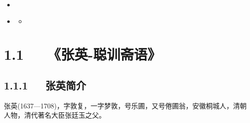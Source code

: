 \documentclass[letterpaper,10pt,english]{sphinxmanual}
\begin{document}
\begin{sphinxShadowBox}
\begin{itemize}
\begin{itemize}
\begin{itemize}
\item {} 
\label{\detokenize{p00_u5176_u5b83/_u300a_u5f20_u82f1-_u806a_u8bad_u658b_u8bed_u300b_u300a_u5f20_u5ef7_u7389-_u6f84_u6000_u56ed_u8bed_u300b_u5408_u8f91:id25}}{\hyperref[\detokenize{p00_u5176_u5b83/_u300a_u5f20_u82f1-_u806a_u8bad_u658b_u8bed_u300b_u300a_u5f20_u5ef7_u7389-_u6f84_u6000_u56ed_u8bed_u300b_u5408_u8f91:id12}]{}}

\item {} 
\label{\detokenize{p00_u5176_u5b83/_u300a_u5f20_u82f1-_u806a_u8bad_u658b_u8bed_u300b_u300a_u5f20_u5ef7_u7389-_u6f84_u6000_u56ed_u8bed_u300b_u5408_u8f91:id26}}{\hyperref[\detokenize{p00_u5176_u5b83/_u300a_u5f20_u82f1-_u806a_u8bad_u658b_u8bed_u300b_u300a_u5f20_u5ef7_u7389-_u6f84_u6000_u56ed_u8bed_u300b_u5408_u8f91:id13}]{}}
\begin{itemize}
\item {} 
\label{\detokenize{p00_u5176_u5b83/_u300a_u5f20_u82f1-_u806a_u8bad_u658b_u8bed_u300b_u300a_u5f20_u5ef7_u7389-_u6f84_u6000_u56ed_u8bed_u300b_u5408_u8f91:id27}}{\hyperref[\detokenize{p00_u5176_u5b83/_u300a_u5f20_u82f1-_u806a_u8bad_u658b_u8bed_u300b_u300a_u5f20_u5ef7_u7389-_u6f84_u6000_u56ed_u8bed_u300b_u5408_u8f91:id14}]{}}

\end{itemize}

\end{itemize}

\end{itemize}

\end{itemize}
\end{sphinxShadowBox}


\section{1.1   《张英-聪训斋语》}
\label{\detokenize{p00_u5176_u5b83/_u300a_u5f20_u82f1-_u806a_u8bad_u658b_u8bed_u300b_u300a_u5f20_u5ef7_u7389-_u6f84_u6000_u56ed_u8bed_u300b_u5408_u8f91:id3}}

\subsection{1.1.1   张英简介}
\label{\detokenize{p00_u5176_u5b83/_u300a_u5f20_u82f1-_u806a_u8bad_u658b_u8bed_u300b_u300a_u5f20_u5ef7_u7389-_u6f84_u6000_u56ed_u8bed_u300b_u5408_u8f91:id4}}
张英(1637—1708)，字敦复，一字梦敦，号乐圃，又号倦圃翁，安徽桐城人，清朝人物，清代著名大臣张廷玉之父。
\end{document}
